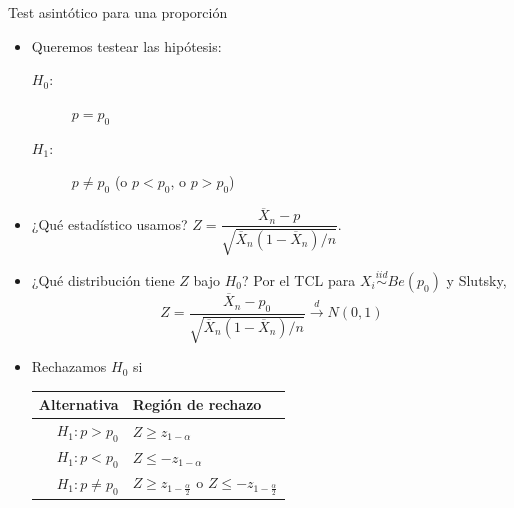 \documentclass{beamer}
\theoremstyle{definition}
\newcommand{\cw}{\overset{d}{\rightarrow}}
\begin{document}
\begin{frame}{\color{rosee}Test asint\'otico para una proporci\'on}\small
    \begin{itemize}
    \item Queremos testear las hip\'otesis:
      \begin{description}
      \item[$H_0$:] $p = p_0$
      \item[$H_1$:] $p \neq p_0$ (o $p < p_0$, o $p > p_0$)
      \end{description}
    \item ¿Qu\'e estad\'istico usamos?
      $Z =  \dfrac{\overline{X}_n - p}{\sqrt{\overline{X}_n(1 - \overline{X}_n)/n}}$.
    \item ¿Qu\'e distribuci\'on tiene $Z$ bajo $H_0$? Por el TCL para $X_i\stackrel{iid}{\sim}Be(p_0)$ y Slutsky,
      \[Z = \dfrac{\overline{X}_n - p_0}{\sqrt{\overline{X}_n (1 - \overline{X}_n )/n}}
        \cw N(0,1)\]
    \item Rechazamos $H_0$ si
    \vspace*{-6pt}
    \begin{table}
      \begin{tabular}{r|l}
        Alternativa & Regi\'on de rechazo \\
        \hline
        $H_1: p > p_0$ & $Z \geq z_{1-\alpha}$ \\
        $H_1: p < p_0$ & $Z \leq- z_{1-\alpha}$ \\
        $H_1: p \neq p_0$ & $Z \geq z_{1-\frac{\alpha}{2}}$ o $Z \leq -z_{1-\frac{\alpha}{2}}$\\
      \end{tabular}
    \end{table}
  \end{itemize}

\end{frame}

%    
%    
\end{document}
